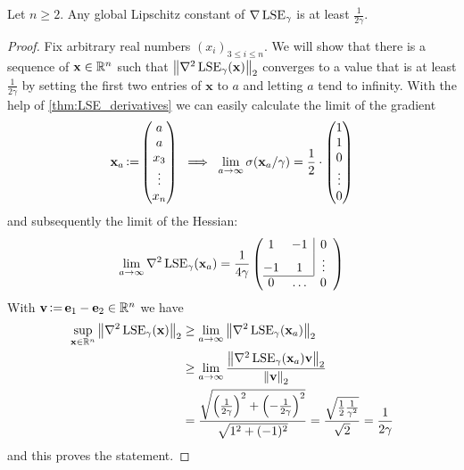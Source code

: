 \begin{theorem} \label{thm:LSE_Lipschitz_constant_lower_bound}
 Let \(n \geq 2\). Any global Lipschitz constant of \(\nabla \operatorname{LSE}_\gamma\) is at least \(\frac{1}{2\gamma}\).
\end{theorem}

\begin{proof}
 Fix arbitrary real numbers \((x_i)_{3 \leq i \leq n}\).
 We will show that there is a sequence of \(\mathbf{x} \in \mathbb{R}^n\) 
 such that \(\left\lVert \nabla^2 \operatorname{LSE}_\gamma(\mathbf{x}) \right\rVert_2\) converges to a value that is at least \(\frac{1}{2 \gamma}\)
 by setting the first two entries of \(\mathbf{x}\) to \(a\) and letting \(a\) tend to infinity.
 With the help of \cref{thm:LSE_derivatives} we can easily calculate the limit of the gradient
 \[ \mathbf{x}_a \operatorname{\vcentcolon=} \begin{pmatrix} a \\ a \\ x_3 \\ \vdots \\ x_n \end{pmatrix} \;
    \implies \; \lim_{a \to \infty} \sigma(\mathbf{x}_a / \gamma) = \frac{1}{2} \cdot \begin{pmatrix} 1 \\ 1 \\ 0 \\ \vdots \\ 0 \end{pmatrix} \]
 and subsequently the limit of the Hessian:
 \[ \lim_{a \to \infty} \nabla^2 \LSE_\gamma(\mathbf{x}_a) 
    = \frac{1}{4 \gamma} \BktR{ \begin{array}{@{}ccc@{}}  1 & -1 & \multicolumn{1}{|c}{0} \\
                                                         -1 &  1 & \multicolumn{1}{|c}{\vdots} \\ \cline{1-2} 
                                                          0 & \ldots & \multicolumn{1}{c}{0}                    \end{array} }\]
 With \(\mathbf{v} \operatorname{\vcentcolon=} \mathbf{e}_1 - \mathbf{e}_2 \in \mathbb{R}^n\) we have
 \begin{align*}
  \sup_{\mathbf{x} \in \mathbb{R}^n} \left\lVert\nabla^2 \operatorname{LSE}_\gamma(\mathbf{x})\right\rVert_2 & \geq \lim_{a \to \infty} \left\lVert\nabla^2 \operatorname{LSE}_\gamma(\mathbf{x}_a)\right\rVert_2 \\
                                                                          & \geq \lim_{a \to \infty} \frac{\left\lVert\nabla^2 \operatorname{LSE}_\gamma(\mathbf{x}_a) \mathbf{v}\right\rVert_2}{\left\lVert\mathbf{v}\right\rVert_2} \\
                                                                          & = \frac{\sqrt{\left({\frac{1}{2 \gamma}}\right)^2 + \left({-\frac{1}{2 \gamma}}\right)^2}}{\sqrt{1^2 + (-1)^2}} = \frac{\sqrt{\frac{1}{2} \frac{1}{\gamma^2}}}{\sqrt{2}} = \frac{1}{2 \gamma}
 \end{align*}
 and this proves the statement.
\end{proof}


